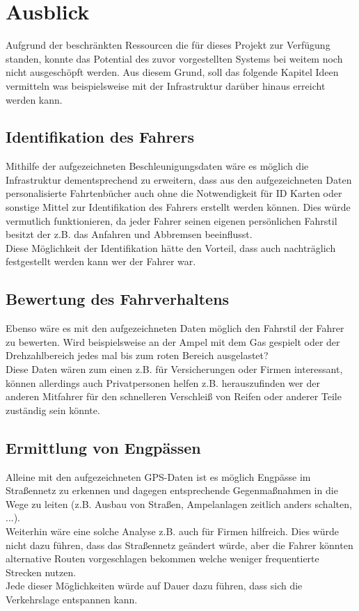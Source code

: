 \chapter{Ausblick}
\label{sec:outlook}
Aufgrund der beschränkten Ressourcen die für dieses Projekt zur Verfügung standen, konnte das Potential des zuvor vorgestellten Systems bei weitem noch nicht ausgeschöpft werden. Aus diesem Grund, soll das folgende Kapitel Ideen vermitteln was beispielsweise mit der Infrastruktur darüber hinaus erreicht werden kann.

\section{Identifikation des Fahrers}
Mithilfe der aufgezeichneten Beschleunigungsdaten wäre es möglich die Infrastruktur dementsprechend zu erweitern, dass aus den aufgezeichneten Daten personalisierte Fahrtenbücher auch ohne die Notwendigkeit für ID Karten oder sonstige Mittel zur Identifikation des Fahrers erstellt werden können. Dies würde vermutlich funktionieren, da jeder Fahrer seinen eigenen persönlichen Fahrstil besitzt der z.B. das Anfahren und Abbremsen beeinflusst.
\\
Diese Möglichkeit der Identifikation hätte den Vorteil, dass auch nachträglich festgestellt werden kann wer der Fahrer war.

\section{Bewertung des Fahrverhaltens}
Ebenso wäre es mit den aufgezeichneten Daten möglich den Fahrstil der Fahrer zu bewerten. Wird beispielsweise an der Ampel mit dem Gas gespielt oder der Drehzahlbereich jedes mal bis zum roten Bereich ausgelastet?
\\
Diese Daten wären zum einen z.B. für Versicherungen oder Firmen interessant, können allerdings auch Privatpersonen helfen z.B. herauszufinden wer der anderen Mitfahrer für den schnelleren Verschleiß von Reifen oder anderer Teile zuständig sein könnte.

\section{Ermittlung von Engpässen}
\label{SecErmittlungVonEngpaessen}
Alleine mit den aufgezeichneten GPS-Daten ist es möglich Engpässe im Straßennetz zu erkennen und dagegen entsprechende Gegenmaßnahmen in die Wege zu leiten (z.B. Ausbau von Straßen, Ampelanlagen zeitlich anders schalten, ...).
\\
Weiterhin wäre eine solche Analyse z.B. auch für Firmen hilfreich. Dies würde nicht dazu führen, dass das Straßennetz geändert würde, aber die Fahrer könnten alternative Routen vorgeschlagen bekommen welche weniger frequentierte Strecken nutzen.
\\
Jede dieser Möglichkeiten würde auf Dauer dazu führen, dass sich die Verkehrslage entspannen kann.

